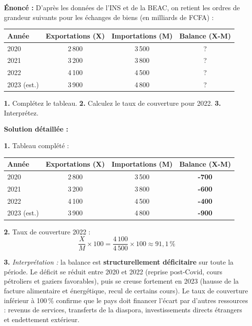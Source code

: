 \documentclass[11pt]{article}
\begin{document}
\begin{exoresolu}
\textbf{Énoncé :} D'après les données de l'INS et de la BEAC, on retient les ordres de grandeur suivants pour les échanges de biens (en milliards de FCFA) :
\begin{center}
\begin{tabular}{|l|c|c|c|}\hline
\textbf{Année} & \textbf{Exportations (X)} & \textbf{Importations (M)} & \textbf{Balance (X-M)} \\ \hline
2020 & 2\,800 & 3\,500 & ? \\ \hline
2021 & 3\,200 & 3\,800 & ? \\ \hline
2022 & 4\,100 & 4\,500 & ? \\ \hline
2023 (est.) & 3\,900 & 4\,800 & ? \\ \hline
\end{tabular}
\end{center}
\textbf{1.} Complétez le tableau. \textbf{2.} Calculez le taux de couverture pour 2022. \textbf{3.} Interprétez.

\tcblower
\textbf{Solution détaillée :}

\textbf{1.} Tableau complété :
\begin{center}
\begin{tabular}{|l|c|c|c|}\hline
\textbf{Année} & \textbf{Exportations (X)} & \textbf{Importations (M)} & \textbf{Balance (X-M)} \\ \hline
2020 & 2\,800 & 3\,500 & \textbf{-700} \\ \hline
2021 & 3\,200 & 3\,800 & \textbf{-600} \\ \hline
2022 & 4\,100 & 4\,500 & \textbf{-400} \\ \hline
2023 (est.) & 3\,900 & 4\,800 & \textbf{-900} \\ \hline
\end{tabular}
\end{center}

\textbf{2.} Taux de couverture 2022 :
\[
\frac{X}{M} \times 100 = \frac{4\,100}{4\,500} \times 100 \approx 91{,}1\,\%
\]

\textbf{3.} \emph{Interprétation :} la balance est \textbf{structurellement déficitaire} sur toute la période. Le déficit se réduit entre 2020 et 2022 (reprise post-Covid, cours pétroliers et gaziers favorables), puis se creuse fortement en 2023 (hausse de la facture alimentaire et énergétique, recul de certains cours). Le taux de couverture inférieur à 100\,\% confirme que le pays doit financer l'écart par d'autres ressources : revenus de services, transferts de la diaspora, investissements directs étrangers et endettement extérieur.
\end{exoresolu}
\end{document}
